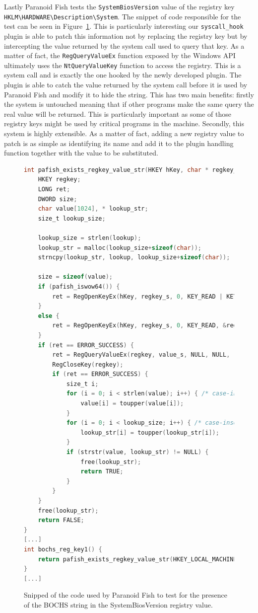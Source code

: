 Lastly Paranoid Fish tests the \lstinline{SystemBiosVersion} value of the registry key \lstinline{HKLM\HARDWARE\Description\System}. The snippet of code responsible for the test can be seen in Figure~\ref{fig:patest2}. This is particularly interesting our \lstinline{syscall_hook} plugin is able to patch this information not by replacing the registry key but by intercepting the value returned by the system call used to query that key. As a matter of fact, the \lstinline{RegQueryValueEx} function exposed by the Windows API ultimately uses the \lstinline{NtQueryValueKey} function to access the registry. This is a system call and is exactly the one hooked by the newly developed plugin. The plugin is able to catch the value returned by the system call before it is used by Paranoid Fish and modify it to hide the string. This has two main benefits: firstly the system is untouched meaning that if other programs make the same query the real value will be returned. This is particularly important as some of those registry keys might be used by critical programs in the machine. Secondly, this system is highly extensible. As a matter of fact, adding a new registry value to patch is as simple as identifying its name and add it to the plugin handling function together with the value to be substituted.

\begin{figure}[htp]
\centering
\begin{lstlisting}[language=C]
int pafish_exists_regkey_value_str(HKEY hKey, char * regkey_s, char * value_s, char * lookup) {
	HKEY regkey;
	LONG ret;
	DWORD size;
	char value[1024], * lookup_str;
	size_t lookup_size;

	lookup_size = strlen(lookup);
	lookup_str = malloc(lookup_size+sizeof(char));
	strncpy(lookup_str, lookup, lookup_size+sizeof(char));

	size = sizeof(value);
	if (pafish_iswow64()) {
		ret = RegOpenKeyEx(hKey, regkey_s, 0, KEY_READ | KEY_WOW64_64KEY, &regkey);
	}
	else {
		ret = RegOpenKeyEx(hKey, regkey_s, 0, KEY_READ, &regkey);
	}
	if (ret == ERROR_SUCCESS) {
		ret = RegQueryValueEx(regkey, value_s, NULL, NULL, (BYTE*)value, &size);
		RegCloseKey(regkey);
		if (ret == ERROR_SUCCESS) {
			size_t i;
			for (i = 0; i < strlen(value); i++) { /* case-insensitive */
				value[i] = toupper(value[i]);
			}
			for (i = 0; i < lookup_size; i++) { /* case-insensitive */
				lookup_str[i] = toupper(lookup_str[i]);
			}
			if (strstr(value, lookup_str) != NULL) {
				free(lookup_str);
				return TRUE;
			}
		}
	}
	free(lookup_str);
	return FALSE;
}
[...]
int bochs_reg_key1() {
	return pafish_exists_regkey_value_str(HKEY_LOCAL_MACHINE, "HARDWARE\\Description\\System", "SystemBiosVersion", "BOCHS");
}
[...]
\end{lstlisting}
\caption{Snipped of the code used by Paranoid Fish to test for the presence of the BOCHS string in the SystemBiosVersion registry value.}
\label{fig:patest2}
\end{figure}

